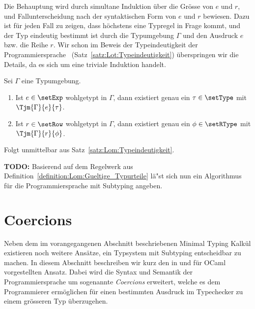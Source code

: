 \begin{beweis}
  Die Behauptung wird durch simultane Induktion \"uber die Gr\"osse von $e$ und $r$, und
  Fallunterscheidung nach der syntaktischen Form von $e$ und $r$ bewiesen. Dazu ist f\"ur jeden Fall zu zeigen,
  dass h\"ochstens eine Typregel in Frage kommt, und der Typ eindeutig bestimmt ist durch die
  Typumgebung $\Gamma$ und den Ausdruck $e$ bzw. die Reihe $r$. Wir schon im Beweis der Typeindeutigkeit
  der Programmiersprache \Lot\ (Satz~\ref{satz:Lot:Typeindeutigkeit}) \"uberspringen wir die Details,
  da es sich um eine triviale Induktion handelt.
\end{beweis}

\begin{korollar}
  Sei $\Gamma$ eine Typumgebung.
  \begin{enumerate}
    \item Ist $e\in\setExp$ wohlgetypt in $\Gamma$, dann existiert genau ein $\tau\in\setType$
          mit $\Tjm{\Gamma}{e}{\tau}$.
    \item Ist $r\in\setRow$ wohlgetypt in $\Gamma$, dann existiert genau ein $\phi\in\setRType$
          mit $\Tjm{\Gamma}{r}{\phi}$.
  \end{enumerate}
\end{korollar}

\begin{beweis}
  Folgt unmittelbar aus Satz~\ref{satz:Lom:Typeindeutigkeit}.
\end{beweis}

{\bf TODO:} Basierend auf dem Regelwerk aus Definition~\ref{definition:Lom:Gueltige_Typurteile} l\"a"st sich nun ein
Algorithmus f\"ur die Programmiersprache mit Subtyping angeben.



\section{Coercions}
\label{abschnitt:Subtyping:Coercions}

Neben dem im vorangegangenen Abschnitt beschriebenen Minimal Typing Kalk\"ul existieren noch weitere Ans\"atze, ein
Typsystem mit Subtyping entscheidbar zu machen. In diesem Abschnitt beschreiben wir kurz den in \cite{Remy98} und
\cite{Remy02} f\"ur OCaml vorgestellten Ansatz. Dabei wird die Syntax und Semantik der Programmiersprache um
sogenannte {\em Coercions} erweitert, welche es dem Programmierer erm\"oglichen f\"ur einen bestimmten Ausdruck
im Typechecker zu einem gr\"osseren Typ \"uberzugehen.


